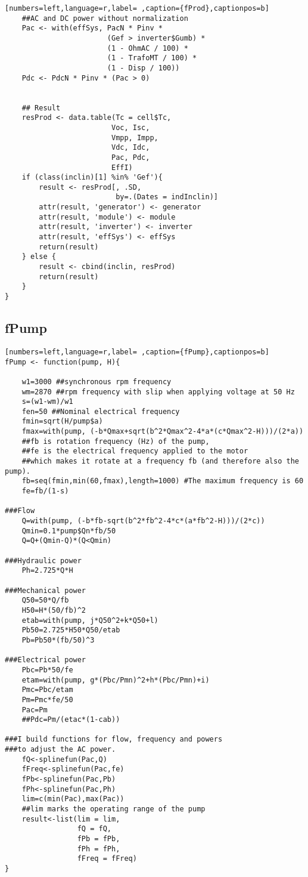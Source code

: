 \begin{lstlisting}[numbers=left,language=r,label= ,caption={fProd},captionpos=b]
    ##AC and DC power without normalization
    Pac <- with(effSys, PacN * Pinv *
                        (Gef > inverter$Gumb) *
                        (1 - OhmAC / 100) *
                        (1 - TrafoMT / 100) *
                        (1 - Disp / 100))
    Pdc <- PdcN * Pinv * (Pac > 0)


    ## Result
    resProd <- data.table(Tc = cell$Tc,
                         Voc, Isc,
                         Vmpp, Impp,
                         Vdc, Idc,
                         Pac, Pdc,
                         EffI)
    if (class(inclin)[1] %in% 'Gef'){
        result <- resProd[, .SD,
                          by=.(Dates = indInclin)]
        attr(result, 'generator') <- generator
        attr(result, 'module') <- module
        attr(result, 'inverter') <- inverter
        attr(result, 'effSys') <- effSys
        return(result)
    } else {
        result <- cbind(inclin, resProd)
        return(result)
    }
}
\end{lstlisting}
\subsection{fPump}
\label{sec:org2d9225a}
\label{subsec:fpump}
\begin{lstlisting}[numbers=left,language=r,label= ,caption={fPump},captionpos=b]
fPump <- function(pump, H){

    w1=3000 ##synchronous rpm frequency
    wm=2870 ##rpm frequency with slip when applying voltage at 50 Hz
    s=(w1-wm)/w1
    fen=50 ##Nominal electrical frequency
    fmin=sqrt(H/pump$a)
    fmax=with(pump, (-b*Qmax+sqrt(b^2*Qmax^2-4*a*(c*Qmax^2-H)))/(2*a))
    ##fb is rotation frequency (Hz) of the pump,  
    ##fe is the electrical frequency applied to the motor
    ##which makes it rotate at a frequency fb (and therefore also the pump).
    fb=seq(fmin,min(60,fmax),length=1000) #The maximum frequency is 60
    fe=fb/(1-s)

###Flow
    Q=with(pump, (-b*fb-sqrt(b^2*fb^2-4*c*(a*fb^2-H)))/(2*c))
    Qmin=0.1*pump$Qn*fb/50
    Q=Q+(Qmin-Q)*(Q<Qmin)

###Hydraulic power
    Ph=2.725*Q*H

###Mechanical power
    Q50=50*Q/fb
    H50=H*(50/fb)^2
    etab=with(pump, j*Q50^2+k*Q50+l)
    Pb50=2.725*H50*Q50/etab
    Pb=Pb50*(fb/50)^3

###Electrical power
    Pbc=Pb*50/fe
    etam=with(pump, g*(Pbc/Pmn)^2+h*(Pbc/Pmn)+i)
    Pmc=Pbc/etam
    Pm=Pmc*fe/50
    Pac=Pm
    ##Pdc=Pm/(etac*(1-cab))

###I build functions for flow, frequency and powers
###to adjust the AC power.
    fQ<-splinefun(Pac,Q)
    fFreq<-splinefun(Pac,fe)
    fPb<-splinefun(Pac,Pb)
    fPh<-splinefun(Pac,Ph)
    lim=c(min(Pac),max(Pac))
    ##lim marks the operating range of the pump
    result<-list(lim = lim,
                 fQ = fQ,
                 fPb = fPb,
                 fPh = fPh,
                 fFreq = fFreq)
}
\end{lstlisting}
